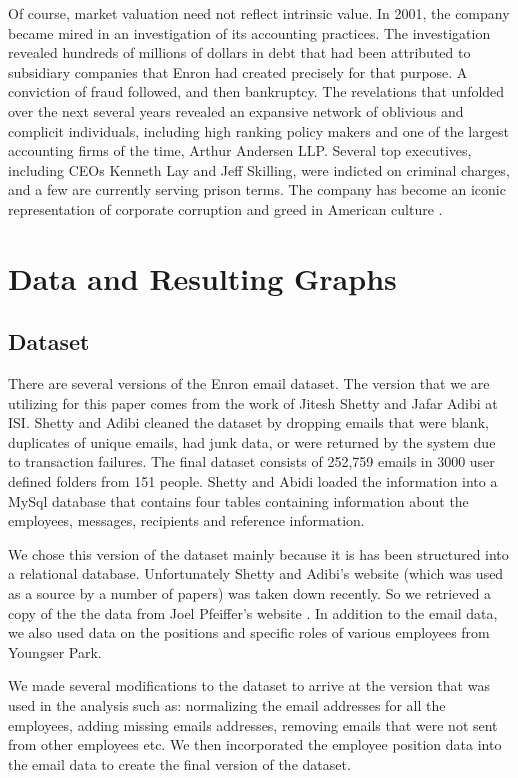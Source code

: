 \documentclass[12pt]{article}
\begin{document}
Of course, market valuation need not reflect intrinsic value. In 2001, the company became mired in an investigation of its accounting practices. The investigation revealed hundreds of millions of dollars in debt that had been attributed to subsidiary companies that Enron had created precisely for that purpose. A conviction of fraud followed, and then bankruptcy. The revelations that unfolded over the next several years revealed an expansive network of oblivious and complicit individuals, including high ranking policy makers and one of the largest accounting firms of the time, Arthur Andersen LLP. Several top executives, including CEOs Kenneth Lay and Jeff Skilling, were indicted on criminal charges, and a few are currently serving prison terms. The company has become an iconic representation of corporate corruption and greed in American culture \cite{npr}.

\section{Data and Resulting Graphs}
	\subsection{Dataset}
	There are several versions of the Enron email dataset. The version that we are utilizing for this paper comes from the work of Jitesh Shetty and Jafar Adibi \cite{shetty} at ISI. Shetty and Adibi cleaned the dataset by dropping emails that were blank, duplicates of unique emails, had junk data, or were returned by the system due to transaction failures. The final dataset consists of 252,759 emails in 3000 user defined folders from 151 people. Shetty and Abidi loaded the information into a MySql database that contains four tables containing information about the employees, messages, recipients and reference information. 
	
	We chose this version of the dataset mainly because it is has been structured into a relational database. Unfortunately Shetty and Adibi's website (which was used as a source by a number of papers) was taken down recently. So we retrieved a copy of the the data from Joel Pfeiffer's website \cite{pfeiffer}. In addition to the email data, we also used data on the positions and specific roles of various employees from Youngser Park\cite{park}.
	
	We made several modifications to the dataset to arrive at the version that was used in the analysis such as: normalizing the email addresses for all the employees, adding missing emails addresses, removing emails that were not sent from other employees etc. We then incorporated the employee position data into the email data to create the final version of the dataset. 
\end{document}

